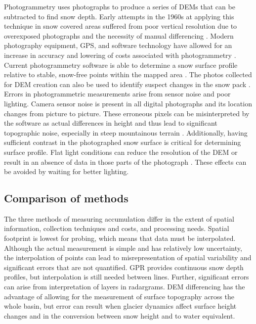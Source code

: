 \documentclass[12pt]{article}
\begin{document}
Photogrammetry uses photographs to produce a series of DEMs that can be subtracted to find snow depth. Early attempts in the 1960s at applying this technique in snow covered areas suffered from poor vertical resolution due to overexposed photographs and the necessity of manual differencing \citep{Nolan2015}. Modern photography equipment, GPS, and software technology have allowed for an increase in accuracy and lowering of costs associated with photogrammetry \citep{Nolan2015}. Current photogrammetry software is able to determine a snow surface profile relative to stable, snow-free points within the mapped area \citep{Farinotti2010}. The photos collected for DEM creation can also be used to identify suspect changes in the snow pack \citep{Nolan2015}.
Errors in photogrammetric measurements arise from sensor noise and poor lighting. Camera sensor noise is present in all digital photographs and its location changes from picture to picture. These erroneous pixels can be misinterpreted by the software as actual differences in height and thus lead to significant topographic noise, especially in steep mountainous terrain \citep{Nolan2015}. Additionally, having sufficient contrast in the photographed snow surface is critical for determining surface profile. Flat light conditions can reduce the resolution of the DEM or result in an absence of data in those parts of the photograph \citep{Nolan2015}. These effects can be avoided by waiting for better lighting. 

\subsection{Comparison of methods}
\label{sec:comparemethods}
The three methods of measuring accumulation differ in the extent of spatial information, collection techniques and costs, and processing needs. Spatial footprint is lowest for probing, which means that data must be interpolated. Although the actual measurement is simple and has relatively low uncertainty, the interpolation of points can lead to misrepresentation of spatial variability and significant errors that are not quantified. GPR provides continuous snow depth profiles, but interpolation is still needed between lines. Further, significant errors can arise from interpretation of layers in radargrams. DEM differencing has the advantage of allowing for the measurement of surface topography across the whole basin, but error can result when glacier dynamics affect surface height changes and in the conversion between snow height and to water equivalent. 
\end{document}
